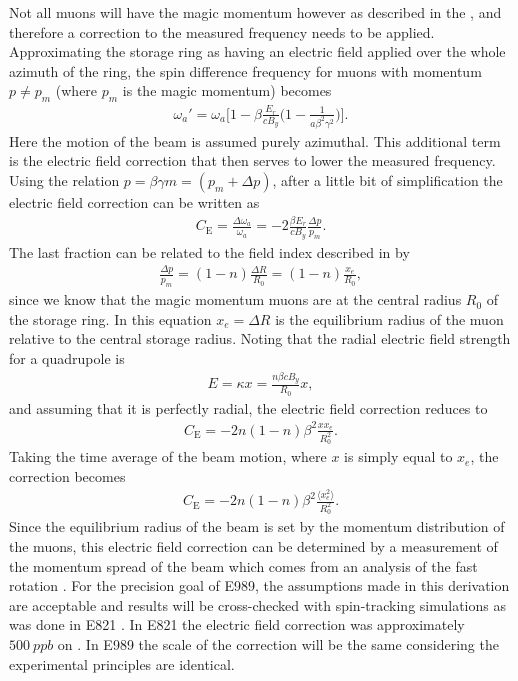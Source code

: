 Not all muons will have the magic momentum however as described in the , and therefore a correction to the measured \wa frequency needs to be applied. Approximating the storage ring as having an electric field applied over the whole azimuth of the ring, the spin difference frequency for muons with momentum $p \neq p_{m}$ (where $p_{m}$ is the magic momentum) becomes  
        \begin{align} \label{eq:waEfield}
            \omega_{a}' = \omega_{a} \Big[ 1 - \beta \frac{E_{r}}{c B_{y}} \Big( 1 - \frac{1}{a \beta^{2} \gamma^{2}} \Big) \Big].
        \end{align}
Here the motion of the beam is assumed purely azimuthal. This additional term is the electric field correction that then serves to lower the measured \wa frequency. Using the relation $p = \beta \gamma m = (p_{m} + \Delta p)$, after a little bit of simplification the electric field correction can be written as
        \begin{align}
            C_{\text{E}} = \frac{\Delta\omega_{a}}{\omega_{a}} = -2 \frac{\beta E_{r}}{c B_{y}} \frac{\Delta p}{p_{m}}.
        \end{align}
The last fraction can be related to the field index described in  by
        \begin{align}
            \frac{\Delta p}{p_{m}} = (1-n) \frac{\Delta R}{R_{0}} = (1-n) \frac{x_{e}}{R_{0}}, 
        \end{align}
since we know that the magic momentum muons are at the central radius $R_{0}$ of the storage ring. In this equation $x_{e} = \Delta R$ is the equilibrium radius of the muon relative to the central storage radius. Noting that the radial electric field strength for a quadrupole is 
        \begin{align}
            E = \kappa x = \frac{n \beta c B_{y}}{R_{0}} x,
        \end{align}
and assuming that it is perfectly radial, the electric field correction reduces to 
        \begin{align}
            C_{\text{E}} = -2n (1-n) \beta^{2} \frac{x x_{e}}{R_{0}^{2}}.
        \end{align}
Taking the time average of the beam motion, where $x$ is simply equal to $x_{e}$, the correction becomes
        \begin{align}
            C_{\text{E}} = -2n (1-n) \beta^{2} \frac{\langle x_{e}^{2} \rangle}{R_{0}^{2}}.
        \end{align}
Since the equilibrium radius of the beam is set by the momentum distribution of the muons, this electric field correction can be determined by a measurement of the momentum spread of the beam which comes from an analysis of the fast rotation \cite{fastrotation1,fastrotation2}. For the precision goal of E989, the assumptions made in this derivation are acceptable \cite{TDR} and results will be cross-checked with spin-tracking simulations as was done in E821 \cite{E821FinalReport}. In E821 the electric field correction was approximately $\SI{500}{ppb}$ on \wa \cite{E821FinalReport}. In E989 the scale of the correction will be the same considering the experimental principles are identical.


